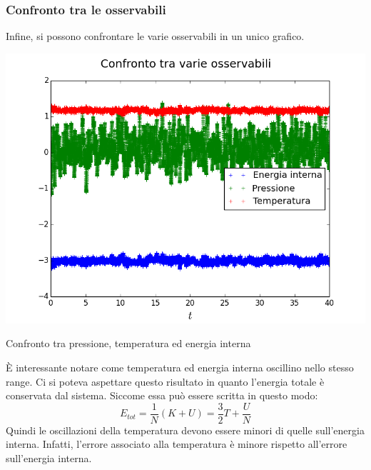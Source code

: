 \subsubsection{Confronto tra le osservabili}
Infine, si possono confrontare le varie osservabili in un unico grafico.
\begin{myfig}
\includegraphics[scale=0.55]{soft_core/10_cfr.png}
\caption{Confronto tra pressione, temperatura ed energia interna}
\end{myfig}
È interessante notare come temperatura ed energia interna oscillino nello stesso range.
Ci si poteva aspettare questo risultato in quanto l'energia totale è conservata dal sistema.
Siccome essa può essere scritta in questo modo:
$$
	E_{tot} = \frac{1}{N} (K + U) = \frac{3}{2} T+ \frac{U}{N} 
$$
Quindi le oscillazioni della temperatura devono essere minori di quelle sull'energia interna. Infatti, l'errore associato alla temperatura è minore rispetto all'errore sull'energia interna.


